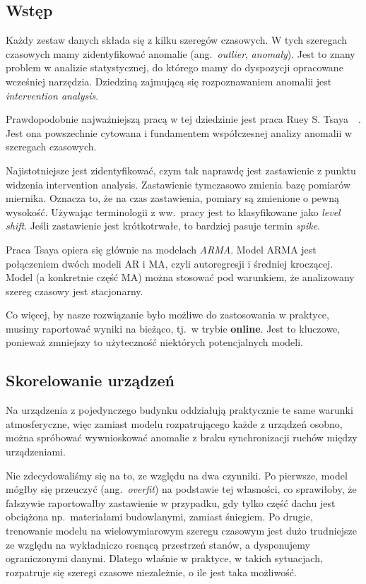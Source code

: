 \subsection{Wstęp}
Każdy zestaw danych składa się z kilku szeregów czasowych.
W tych szeregach czasowych mamy zidentyfikować anomalie (ang.\ \emph{outlier}, \emph{anomaly}).
Jest to znany problem w analizie statystycznej, do którego mamy do dyspozycji opracowane wcześniej narzędzia.
Dziedziną zajmującą się rozpoznawaniem anomalii jest \emph{intervention analysis}.

Prawdopodobnie najważniejszą pracą w tej dziedzinie jest praca Ruey S. Tsaya~~\cite{https://doi.org/10.1002/for.3980070102}.
Jest ona powszechnie cytowana i fundamentem współczesnej analizy anomalii w szeregach czasowych.

Najistotniejsze jest zidentyfikować, czym tak naprawdę jest zastawienie z punktu widzenia intervention analysis.
Zastawienie tymczasowo zmienia bazę pomiarów miernika.
Oznacza to, że na czas zastawienia, pomiary są zmienione o pewną wysokość.
Używając terminologii z ww.\ pracy jest to klasyfikowane jako \emph{level shift}.
Jeśli zastawienie jest krótkotrwałe, to bardziej pasuje termin \emph{spike}.

Praca Tsaya opiera się głównie na modelach \emph{ARMA}.
Model ARMA jest połączeniem dwóch modeli AR i MA, czyli autoregresji i średniej kroczącej.
Model (a konkretnie część MA) można stosować pod warunkiem, że analizowany szereg czasowy jest stacjonarny.

Co więcej, by nasze rozwiązanie było możliwe do zastosowania w praktyce, musimy raportować wyniki na bieżąco, tj.\ w trybie \textbf{online}.
Jest to kluczowe, ponieważ zmniejszy to użyteczność niektórych potencjalnych modeli.

\subsection{Skorelowanie urządzeń}
Na urządzenia z pojedynczego budynku oddziałują praktycznie te same warunki atmosferyczne, więc zamiast modelu rozpatrującego każde z urządzeń osobno, można spróbować wywnioskować anomalie z braku synchronizacji ruchów między urządzeniami.

Nie zdecydowaliśmy się na to, ze względu na dwa czynniki.
Po pierwsze, model mógłby się przeuczyć (ang.\ \emph{overfit}) na podstawie tej własności, co sprawiłoby, że fałszywie raportowałby zastawienie w przypadku, gdy tylko część dachu jest obciążona np.\ materiałami budowlanymi, zamiast śniegiem.
Po drugie, trenowanie modelu na wielowymiarowym szeregu czasowym jest dużo trudniejsze ze względu na wykładniczo rosnącą przestrzeń stanów, a dysponujemy ograniczonymi danymi.
Dlatego właśnie w praktyce, w takich sytuacjach, rozpatruje się szeregi czasowe niezależnie, o ile jest taka możliwość.

